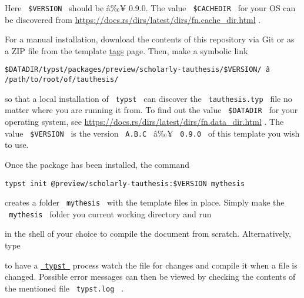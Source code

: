 Here \texttt{\ \$VERSION\ } should be â‰¥ 0.9.0. The value
\texttt{\ \$CACHEDIR\ } for your OS can be discovered from
\url{https://docs.rs/dirs/latest/dirs/fn.cache_dir.html} .

For a manual installation, download the contents of this repository via
Git or as a ZIP file from the template
\href{https://gitlab.com/tuni-official/thesis-templates/tau-typst-thesis-template/-/tags}{tags}
page. Then, make a symbolic link

\begin{verbatim}
$DATADIR/typst/packages/preview/scholarly-tauthesis/$VERSION/ â /path/to/root/of/tauthesis/
\end{verbatim}

so that a local installation of \texttt{\ typst\ } can discover the
\texttt{\ tauthesis.typ\ } file no matter where you are running it from.
To find out the value \texttt{\ \$DATADIR\ } for your operating system,
see \url{https://docs.rs/dirs/latest/dirs/fn.data_dir.html} . The value
\texttt{\ \$VERSION\ } is the version \texttt{\ A.B.C\ } â‰¥
\texttt{\ 0.9.0\ } of this template you wish to use.

Once the package has been installed, the command

\begin{verbatim}
typst init @preview/scholarly-tauthesis:$VERSION mythesis
\end{verbatim}

creates a folder \texttt{\ mythesis\ } with the template files in place.
Simply make the \texttt{\ mythesis\ } folder you current working
directory and run

\begin{Shaded}
\begin{Highlighting}[]
\end{Highlighting}
\end{Shaded}

in the shell of your choice to compile the document from scratch.
Alternatively, type

\begin{Shaded}
\begin{Highlighting}[]
\OperatorTok{\&\textgreater{}}\KeywordTok{\&}
\end{Highlighting}
\end{Shaded}

to have a \href{https://github.com/typst/typst}{\texttt{\ typst\ }}
process watch the file for changes and compile it when a file is
changed. Possible error messages can then be viewed by checking the
contents of the mentioned file \texttt{\ typst.log\ } .

